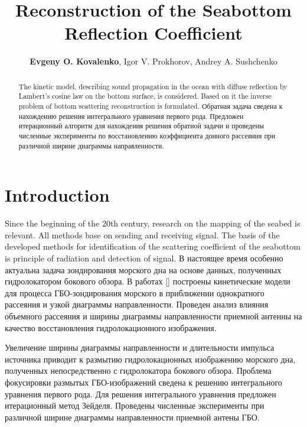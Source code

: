 \documentclass{procDDs}
\title{Reconstruction of the Seabottom Reflection Coefficient}
\author{\textbf{Evgeny O. Kovalenko}, Igor V. Prokhorov, Andrey A. Sushchenko}%
{Institute for Applied Mathematics, FEB RAS, Vladivostok, Russia, \\ 
Far Eastern Federal University, Vladivostok, Russia}                 %
{kovalenko.eo@dvfu.ru, sushchenko.aa@dvfu.ru}                                   %
\begin{document}
\maketitle

\def\k{\mathbf{k}}
\def\n{\mathbf{n}}
\def\x{\mathbf{x}}
\def\y{\mathbf{y}}
\def\r{\mathbf{r}}
\def\p{\mathbf{|}}
\def\z{\mathbf{z}}
\def\V{\mathbf{V}}
\def\Vt{\mathbf{V}t}
\def\exp{\text{exp}}

\begin{abstract}
   The kinetic model, describing sound propagation in the ocean with diffuse reflection by Lambert's cosine law on the bottom surface, is considered. Based on it the inverse problem of bottom scattering reconstruction is formulated. Обратная задача сведена к нахождению решения интегрального уравнения первого рода.
   Предложен итерационный алгоритм для нахождения решения обратной задачи и проведены численные эксперименты по восстановлению коэффициента донного рассеяния при различной ширине диаграммы направленности. 
\end{abstract}

\section{Introduction}



Since the beginning of the 20th century, research on the mapping of the seabed is relevant. All methods base on sending and receiving signal. The basis of the developed methods for identification of the scattering coefficient of the seabottom is principle of radiation and detection of signal. 
В настоящее время особенно актуальна задача зондирования морского дна на основе данных, полученных  гидролокатором бокового обзора. В работах []  построены кинетические модели для процесса ГБО-зондирования морского в приближении однократного рассеяния и узкой диаграммы направленности.   Проведен  анализ влияния объемного рассеяния и ширины диаграммы направленности приемной антенны на качество восстановления гидролокационного изображения.   

Увеличение ширины диаграммы направленности и длительности импульса источника приводит к размытию гидролокационных изображению морского дна, полученных непосредственно с гидролокатора бокового обзора.
Проблема фокусировки размытых ГБО-изображений сведена к решению интегрального уравнения первого рода.
Для решения интегрального уравнения предложен итерационный метод Зейделя. Проведены численные эксперименты при различной ширине диаграммы направленности приемной антены ГБО.
\end{document}
